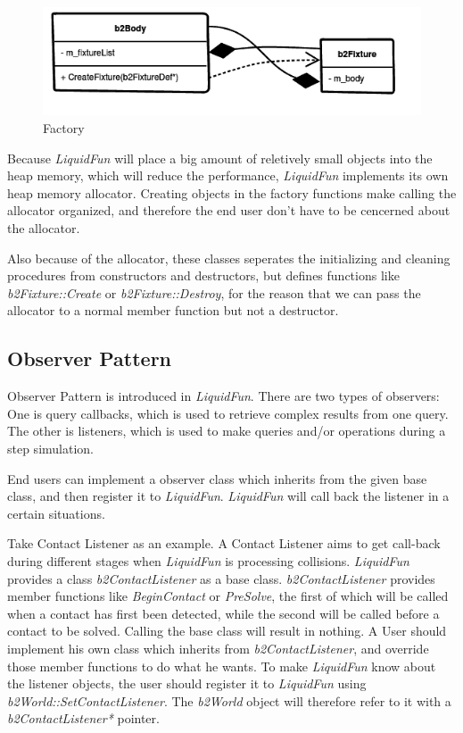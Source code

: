 \documentclass[UTF8]{ctexart}
\begin{document}
            \begin{figure}[ht]
                \centering
                \includegraphics[width=.8\textwidth]{factory.png}
                \caption{Factory}
            \end{figure}

            Because \textit{LiquidFun} will place a big amount of reletively small objects into the heap memory, which will reduce the performance, \textit{LiquidFun} implements its own heap memory allocator. Creating objects in the factory functions make calling the allocator organized, and therefore the end user don't have to be cencerned about the allocator.

            Also because of the allocator, these classes seperates the initializing and cleaning procedures from constructors and destructors, but defines functions like \textit{b2Fixture::Create} or \textit{b2Fixture::Destroy}, for the reason that we can pass the allocator to a normal member function but not a destructor.

        \subsection{Observer Pattern}

            Observer Pattern is introduced in \textit{LiquidFun}. There are two types of observers: One is query callbacks, which is used to retrieve complex results from one query. The other is listeners, which is used to make queries and/or operations during a step simulation.

            End users can implement a observer class which inherits from the given base class, and then register it to \textit{LiquidFun}. \textit{LiquidFun} will call back the listener in a certain situations.

            Take Contact Listener as an example. A Contact Listener aims to get call-back during different stages when \textit{LiquidFun} is processing collisions. \textit{LiquidFun} provides a class \textit{b2ContactListener} as a base class. \textit{b2ContactListener} provides member functions like \textit{BeginContact} or \textit{PreSolve}, the first of which will be called when a contact has first been detected, while the second will be called before a contact to be solved. Calling the base class will result in nothing. A User should implement his own class which inherits from \textit{b2ContactListener}, and override those member functions to do what he wants. To make \textit{LiquidFun} know about the listener objects, the user should register it to \textit{LiquidFun} using \textit{b2World::SetContactListener}. The \textit{b2World} object will therefore refer to it with a \textit{b2ContactListener*} pointer.
\end{document}
